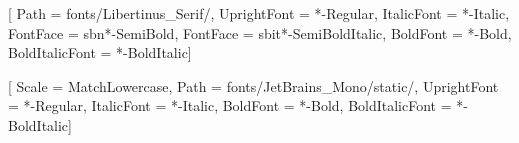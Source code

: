 

\setmainfont{LibertinusSerif}[
    Path            = fonts/Libertinus_Serif/,
    UprightFont     = *-Regular,
    ItalicFont      = *-Italic,
    FontFace        = {sb}{n}{*-SemiBold},
    FontFace        = {sb}{it}{*-SemiBoldItalic},
    BoldFont        = *-Bold,
    BoldItalicFont  = *-BoldItalic]

\setmonofont{JetBrainsMono}[
    Scale           = MatchLowercase,
    Path            = fonts/JetBrains_Mono/static/,
    UprightFont     = *-Regular,
    ItalicFont      = *-Italic,
    BoldFont        = *-Bold,
    BoldItalicFont  = *-BoldItalic]

\pgfplotsset{compat=1.18, grid=both, axis lines=middle}
\lstset{basicstyle=\ttfamily,columns=fullflexible,breaklines=true,frame=shadowbox,keepspaces}

\newcommand{\nth}{^{\text{th}}}

\renewcommand{\qedsymbol}{$\blacksquare$}
\renewcommand{\implies}{\rightarrow}

\usetikzlibrary{arrows,automata,shapes}






\setlength{\parskip}{0.0pt}
\setlength{\parindent}{0pt}

\titleformat{\section}{\titlerule[1pt]\vspace{4.5pt}\bfseries\fontsize{14pt}{14pt}\selectfont}{}{0pt}{}
\titlespacing*{\section}{0pt}{3ex}{0.5ex}

\titleformat{\subsection}{\bfseries\fontsize{12pt}{12pt}\selectfont}{}{0pt}{}
\titlespacing*{\subsection}{0pt}{1ex}{0pt}

